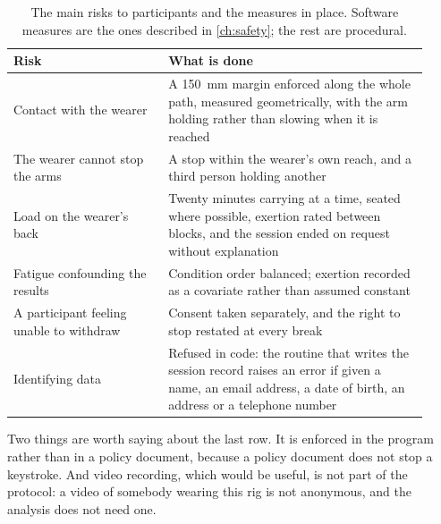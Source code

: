 \begin{table}[htbp]
  \centering
  \small
  \caption[Risks and what is done about them]{The main risks to participants
  and the measures in place. Software measures are the ones described in
  \cref{ch:safety}; the rest are procedural.}
  \label{tab:risks}
  \begin{tabular}{@{}p{0.34\linewidth}p{0.58\linewidth}@{}}
    \toprule
    \textbf{Risk} & \textbf{What is done} \\
    \midrule
    Contact with the wearer & A \SI{150}{\milli\metre} margin enforced along
      the whole path, measured geometrically, with the arm holding rather than
      slowing when it is reached \\
    The wearer cannot stop the arms & A stop within the wearer's own reach, and
      a third person holding another \\
    Load on the wearer's back & Twenty minutes carrying at a time, seated where
      possible, exertion rated between blocks, and the session ended on request
      without explanation \\
    Fatigue confounding the results & Condition order balanced; exertion
      recorded as a covariate rather than assumed constant \\
    A participant feeling unable to withdraw & Consent taken separately, and
      the right to stop restated at every break \\
    Identifying data & Refused in code: the routine that writes the session
      record raises an error if given a name, an email address, a date of
      birth, an address or a telephone number \\
    \bottomrule
  \end{tabular}
\end{table}

Two things are worth saying about the last row. It is enforced in the program
rather than in a policy document, because a policy document does not stop a
keystroke. And video recording, which would be useful, is not part of the
protocol: a video of somebody wearing this rig is not anonymous, and the
analysis does not need one.
